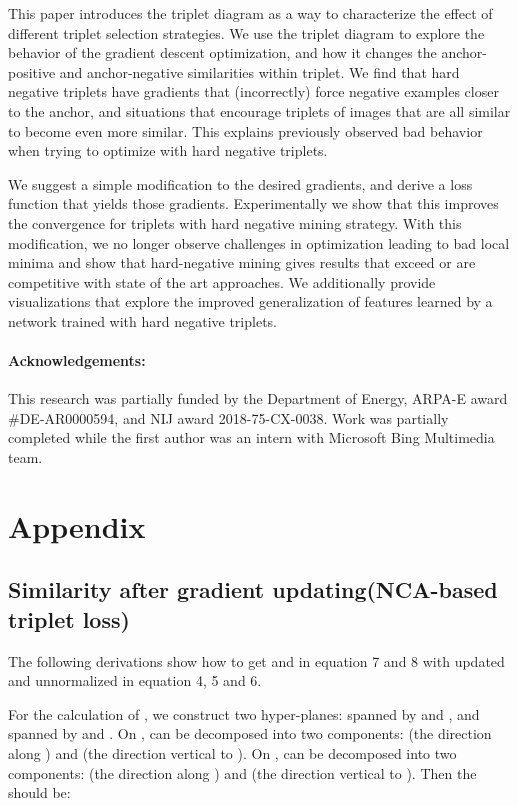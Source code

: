 \documentclass[runningheads]{llncs}
\begin{document}
This paper introduces the triplet diagram as a way to characterize the effect of different triplet selection strategies.  We use the triplet diagram to explore the behavior of the gradient descent optimization, and how it changes the anchor-positive and anchor-negative similarities within triplet.  We find that hard negative triplets have gradients that (incorrectly) force negative examples closer to the anchor, and situations that encourage triplets of images that are all similar to become even more similar.  This explains previously observed bad behavior when trying to optimize with hard negative triplets.

We suggest a simple modification to the desired gradients, and derive a loss function that yields those gradients.  Experimentally we show that this improves the convergence for triplets with hard negative mining strategy.  With this modification, we no longer observe challenges in optimization leading to bad local minima and show that hard-negative mining gives results that exceed or are competitive with state of the art approaches. We additionally provide visualizations that explore the improved generalization of features learned by a network trained with hard negative triplets.

\paragraph{Acknowledgements:} This research was partially funded by the Department of Energy, ARPA-E award \#DE-AR0000594, and NIJ award 2018-75-CX-0038. Work was partially completed while the first author was an intern with Microsoft Bing Multimedia team.

\clearpage



\appendix
\onecolumn
\section*{Appendix}
\subsection{Similarity after gradient updating(NCA-based triplet loss)}
The following derivations show how to get  and  in equation 7 and 8 with updated and unnormalized  in equation 4, 5 and 6.





For the calculation of , we construct two hyper-planes:  spanned by  and , and  spanned by  and . On ,  can be decomposed into two components: (the direction along ) and (the direction vertical to ). On ,  can be decomposed into two components: (the direction along ) and (the direction vertical to ). Then the  should be:
\end{document}
